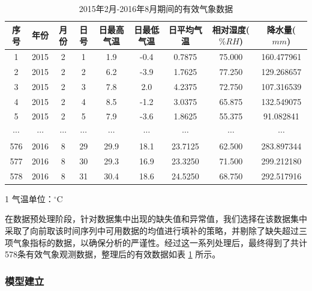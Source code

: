 \begin{table}[!ht]
    \caption{2015年2月-2016年8月期间的有效气象数据}\label{tab:LSTM_data}
    \centering
    \resizebox{1.0\linewidth}{!}
    {\begin{threeparttable} 
    \begin{tabular}{*9{c}}\toprule
        序号 & 年份 & 月份 & 日号 & 日最高气温\tnote{1} & 日最低气温\tnote{1} & 日平均气温\tnote{1}  & 相对湿度($\%RH$) & 降水量($mm$) \\  
        \midrule
        1 & 2015 & 2 & 1 & 1.9 & -0.4 & 0.7875 & 75.000 & 160.477961 \\ 
        2 & 2015 & 2 & 2 & 6.2 & -3.9 & 1.7625 & 77.250 & 129.268657 \\ 
        3 & 2015 & 2 & 3 & 7.8 & 2.0 & 4.2375 & 72.750 & 107.316539 \\ 
        4 & 2015 & 2 & 4 & 8.5 & -1.2 & 3.0375 & 65.875 & 132.549075 \\ 
        5 & 2015 & 2 & 5 & 7.9 & -3.6 & 1.8625 & 55.375 & 91.082841 \\ 
        $\cdots$ & $\cdots$ & $\cdots$ & $\cdots$ & $\cdots$ & $\cdots$ & $\cdots$ & $\cdots$ & $\cdots$ \\ 
        576 & 2016 & 8 & 29 & 29.9 & 18.1 & 23.7125 & 62.500 & 283.897344 \\ 
        577 & 2016 & 8 & 30 & 29.3 & 16.9 & 23.3250 & 71.500 & 299.212180 \\ 
        578 & 2016 & 8 & 31 & 30.4 & 18.6 & 24.5250 & 68.750 & 292.517916 \\
        \bottomrule
    \end{tabular}    
    \begin{tablenotes}    
        \small              
        \item[1] 气温单位：${}^{\circ}\text{C}$
    \end{tablenotes}          
    \end{threeparttable}}
    \vspace{-0.8em}
\end{table}


在数据预处理阶段，针对数据集中出现的缺失值和异常值，我们选择在该数据集中采取了向前取该时间序列中可用数据的均值进行填补的策略，并剔除了缺失超过三项气象指标的数据，以确保分析的严谨性。经过这一系列处理后，最终得到了共计578条有效气象观测数据，整理后的有效数据如表 \ref{tab:LSTM_data} 所示。



\subsubsection{模型建立}\label{subsubsec:lstm_model_build}

